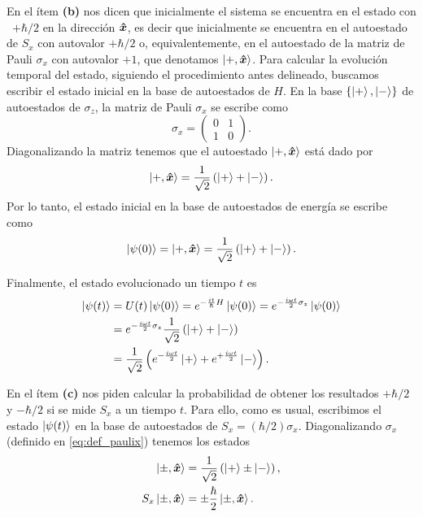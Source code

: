 \documentclass[10pt, a4paper]{article}
\newcommand{\wt}{\omega t}
\numberwithin{equation}{subsection}
\begin{document}
En el ítem \textbf{(b)} nos dicen que inicialmente el sistema se encuentra en
el estado con \spin\ $+\hbar/2$ en la dirección $\vu*{x}$, es decir que
inicialmente se encuentra en el autoestado de $S_x$ con autovalor $+\hbar/2$ o,
equivalentemente, en el autoestado de la matriz de Pauli $\sigma_x$ con
autovalor $+1$, que denotamos $\ket{+,\vu*{x}}$. Para calcular la evolución
temporal del estado, siguiendo el procedimiento antes delineado, buscamos
escribir el estado inicial en la base de autoestados de $H$. En la base
$\set{\ket{+}, \ket{-}}$ de autoestados de $\sigma_z$, la matriz de Pauli
$\sigma_x$ se escribe como
\begin{equation} \label{eq:def_paulix}
  \sigma_x = \begin{pmatrix} 0 & 1 \\ 1 & 0 \end{pmatrix}.
\end{equation}
Diagonalizando la matriz tenemos que el autoestado $\ket{+,\vu*{x}}$ está dado
por
\begin{equation}
  \ket{+,\vu*{x}} = \frac{1}{\sqrt{2}}\left(\ket{+} + \ket{-}\right).
\end{equation}
Por lo tanto, el estado inicial en la base de autoestados de energía se escribe
como
\begin{equation} \label{eq:spinevol_ini_state}
  \ket{\psi(0)} = \ket{+,\vu*{x}} =
  \frac{1}{\sqrt{2}}\left(\ket{+} + \ket{-}\right).
\end{equation}

Finalmente, el estado evolucionado un tiempo $t$ es
\begin{align}
  \ket{\psi(t)} &= U(t)\ket{\psi(0)}
    = e^{-\frac{it}{\hbar}H}\ket{\psi(0)}
    = e^{-\frac{i\wt}{2}\sigma_z}\ket{\psi(0)} \nonumber \\
  &= e^{-\frac{i\wt}{2}\sigma_z}
    \frac{1}{\sqrt{2}}\left(\ket{+} + \ket{-}\right) \nonumber \\
  &= \frac{1}{\sqrt{2}}\left(e^{-\frac{i\wt}{2}}\ket{+} +
    e^{+\frac{i\wt}{2}}\ket{-} \right). \label{eq:spinevol_t_state}
\end{align}

\bigbreak

En el ítem \textbf{(c)} nos piden calcular la probabilidad de obtener los
resultados $+\hbar/2$ y $-\hbar/2$ si se mide $S_x$ a un tiempo $t$. Para ello,
como es usual, escribimos el estado $\ket{\psi(t)}$ en la base de autoestados
de $S_x = (\hbar/2)\sigma_x$. Diagonalizando $\sigma_x$ (definido en
\eqref{eq:def_paulix}) tenemos los estados
\begin{align}
  \ket{\pm,\vu*{x}} &= \frac{1}{\sqrt{2}}\left(\ket{+} \pm \ket{-}\right),\\
  S_x\ket{\pm,\vu*{x}} &= \pm\frac{\hbar}{2}\ket{\pm,\vu*{x}}.
\end{align}
\end{document}

